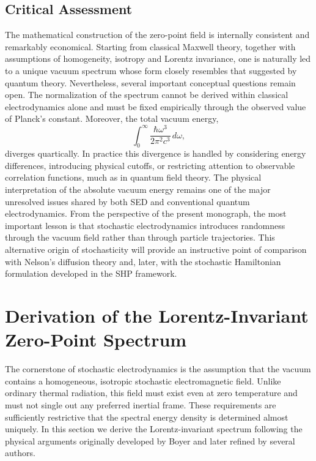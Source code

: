 \subsection*{Critical Assessment}
The mathematical construction of the zero-point field is internally
consistent and remarkably economical. Starting from classical Maxwell
theory, together with assumptions of homogeneity, isotropy and Lorentz
invariance, one is naturally led to a unique vacuum spectrum whose form
closely resembles that suggested by quantum theory.
Nevertheless, several important conceptual questions remain open.
The normalization of the spectrum cannot be derived within classical
electrodynamics alone and must be fixed empirically through the observed
value of Planck's constant.
Moreover, the total vacuum energy,
\[\int_0^\infty\frac{\hbar\omega^3}{2\pi^2c^3}\,d\omega,\]
diverges quartically. In practice this divergence is handled by
considering energy differences, introducing physical cutoffs, or
restricting attention to observable correlation functions, much as in
quantum field theory. The physical interpretation of the absolute vacuum
energy remains one of the major unresolved issues shared by both SED and
conventional quantum electrodynamics.
From the perspective of the present monograph, the most important lesson
is that stochastic electrodynamics introduces randomness through the
vacuum field rather than through particle trajectories. This alternative
origin of stochasticity will provide an instructive point of comparison
with Nelson's diffusion theory and, later, with the stochastic
Hamiltonian formulation developed in the SHP framework.
\section{Derivation of the Lorentz-Invariant Zero-Point Spectrum}
\label{sec:LorentzInvariantSpectrum}
The cornerstone of stochastic electrodynamics is the assumption that the
vacuum contains a homogeneous, isotropic stochastic electromagnetic
field. Unlike ordinary thermal radiation, this field must exist even at
zero temperature and must not single out any preferred inertial frame.
These requirements are sufficiently restrictive that the spectral energy
density is determined almost uniquely. In this section we derive the
Lorentz-invariant spectrum following the physical arguments originally
developed by Boyer and later refined by several authors.
